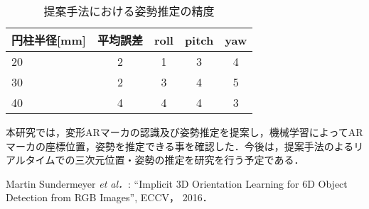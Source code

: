 \documentclass{jsarticle}
\begin{document}






\begin{table}[h]
        \vspace{0zh}
          \begin{center}
            \caption{提案手法における姿勢推定の精度}
            \label{hyouka}
            \begin{tabular}{l|c|c|c|c} \hline
              円柱半径[mm]   &平均誤差& roll& pitch & yaw \\ \hline
 20  &2& 1 & 3 & 4 \\ \hline
              30  & 2&3 & 4 & 5 \\ \hline
              40  & 4&4 &4  & 3 \\ \hline
              \end{tabular}
          \end{center}
        \vspace{-1.0zh}
\end{table}






本研究では，変形ARマーカの認識及び姿勢推定を提案し，機械学習によってARマーカの座標位置，姿勢を推定できる事を確認した．今後は，提案手法のよるリアルタイムでの三次元位置・姿勢の推定を研究を行う予定である．

%
%
%

\begin{thebibliography}{1}

{\scriptsize 
{}
Martin Sundermeyer {\em et al．}: ``Implicit 3D Orientation Learning for 6D Object Detection from RGB Images'', ECCV， 2016．}

\end{thebibliography}
\end{document}
